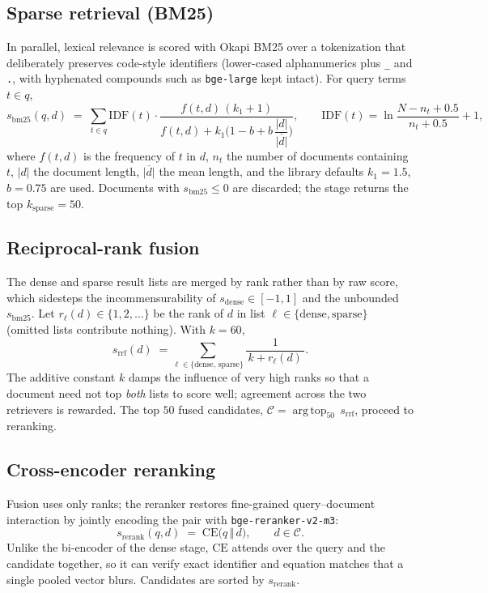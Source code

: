 \documentclass[11pt,a4paper]{article}
\newcommand{\code}[1]{\texttt{\small #1}}
\begin{document}
\subsection{Sparse retrieval (BM25)}
In parallel, lexical relevance is scored with Okapi BM25 over a tokenization that
deliberately preserves code-style identifiers (lower-cased alphanumerics plus
\code{\_} and \code{.}, with hyphenated compounds such as \code{bge-large} kept
intact). For query terms $t\in q$,
\begin{equation}
  s_{\mathrm{bm25}}(q,d) \;=\; \sum_{t\in q}
  \mathrm{IDF}(t)\cdot
  \frac{f(t,d)\,(k_1+1)}{f(t,d) + k_1\Big(1-b+b\,\dfrac{|d|}{\overline{|d|}}\Big)},
  \qquad
  \mathrm{IDF}(t)=\ln\!\frac{N-n_t+0.5}{n_t+0.5}+1,
\end{equation}
where $f(t,d)$ is the frequency of $t$ in $d$, $n_t$ the number of documents
containing $t$, $|d|$ the document length, $\overline{|d|}$ the mean length, and
the library defaults $k_1=1.5$, $b=0.75$ are used. Documents with
$s_{\mathrm{bm25}}\le 0$ are discarded; the stage returns the top
$k_{\mathrm{sparse}}=50$.

\subsection{Reciprocal-rank fusion}
The dense and sparse result lists are merged by rank rather than by raw score,
which sidesteps the incommensurability of $s_{\mathrm{dense}}\in[-1,1]$ and the
unbounded $s_{\mathrm{bm25}}$. Let $r_\ell(d)\in\{1,2,\dots\}$ be the rank of $d$
in list $\ell\in\{\mathrm{dense},\mathrm{sparse}\}$ (omitted lists contribute
nothing). With $k=60$,
\begin{equation}
  s_{\mathrm{rrf}}(d) \;=\!\!\sum_{\ell\in\{\mathrm{dense},\,\mathrm{sparse}\}}
  \frac{1}{\,k + r_\ell(d)\,}.
\end{equation}
The additive constant $k$ damps the influence of very high ranks so that a
document need not top \emph{both} lists to score well; agreement across the two
retrievers is rewarded. The top $50$ fused candidates,
$\mathcal{C}=\operatorname{arg\,top}_{50}\, s_{\mathrm{rrf}}$, proceed to
reranking.

\subsection{Cross-encoder reranking}
Fusion uses only ranks; the reranker restores fine-grained query--document
interaction by jointly encoding the pair with \code{bge-reranker-v2-m3}:
\begin{equation}
  s_{\mathrm{rerank}}(q,d) \;=\; \mathrm{CE}\big(q \,\Vert\, d\big), \qquad d\in\mathcal{C}.
\end{equation}
Unlike the bi-encoder of the dense stage, $\mathrm{CE}$ attends over the query and
the candidate together, so it can verify exact identifier and equation matches
that a single pooled vector blurs. Candidates are sorted by $s_{\mathrm{rerank}}$.
\end{document}
